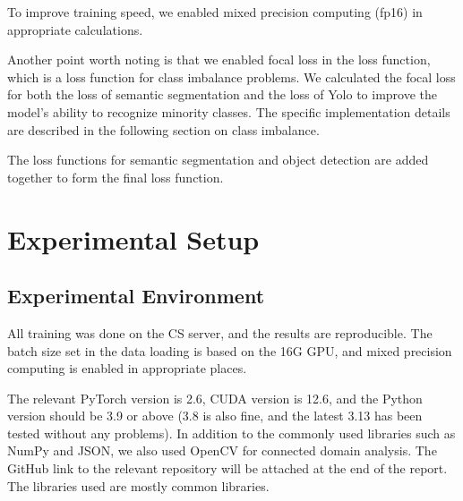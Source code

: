 \documentclass[conference]{IEEEtran}
\begin{document}
To improve training speed, we enabled mixed precision computing (fp16) in appropriate calculations.


Another point worth noting is that we enabled focal loss in the loss function, which is a loss function for class imbalance problems.\cite{b4} We calculated the focal loss for both the loss of semantic segmentation and the loss of Yolo to improve the model's ability to recognize minority classes. The specific implementation details are described in the following section on class imbalance.


The loss functions for semantic segmentation and object detection are added together to form the final loss function.

\section{Experimental Setup}
\subsection{Experimental Environment}



All training was done on the CS server, and the results are reproducible. The batch size set in the data loading is based on the 16G GPU, and mixed precision computing is enabled in appropriate places.

The relevant PyTorch version is 2.6, CUDA version is 12.6, and the Python version should be 3.9 or above (3.8 is also fine, and the latest 3.13 has been tested without any problems). In addition to the commonly used libraries such as NumPy and JSON, we also used OpenCV for connected domain analysis. The GitHub link to the relevant repository will be attached at the end of the report. The libraries used are mostly common libraries.
\end{document}
